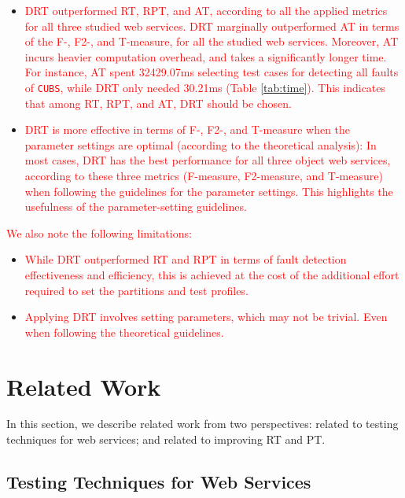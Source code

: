 \documentclass[10pt,journal,compsoc]{IEEEtran}
\begin{document}
\begin{itemize}
  \item
  \textcolor{red}{DRT outperformed RT, RPT, and AT, according to all the applied metrics for all three studied web services. DRT marginally outperformed AT in terms of the F-, F2-, and T-measure, for all the studied web services. Moreover, AT incurs heavier computation overhead, and takes a significantly longer time. For instance, AT spent 32429.07ms selecting test cases for detecting all faults of \texttt{CUBS}, while DRT only needed 30.21ms (Table \ref{tab:time}). This indicates that among RT, RPT, and AT, DRT should be chosen.}

  \item
  \textcolor{red}{DRT is more effective in terms of F-, F2-, and T-measure when the parameter settings are optimal (according to the theoretical analysis): In most cases, DRT has the best performance for all three object web services, according to these three metrics (F-measure, F2-measure, and T-measure) when following the guidelines for the parameter settings. This highlights the usefulness of the parameter-setting guidelines.}
\end{itemize}

\textcolor{red}{We also note the following limitations:}

\begin{itemize}
  \item
  \textcolor{red}{While DRT outperformed RT and RPT in terms of fault detection effectiveness and efficiency, this is achieved at the cost of the additional effort required to set the partitions and test profiles.}

  \item
  \textcolor{red}{Applying DRT involves setting parameters, which may not be trivial. Even when following the theoretical guidelines.}
\end{itemize}


\section{Related Work}
\label{sec:relatedwork}

In this section, we describe related work from two perspectives:
related to testing techniques for web services; and
related to improving RT and PT.

\subsection{Testing Techniques for Web Services}
\label{sec:relatedworkWS}
\end{document}
